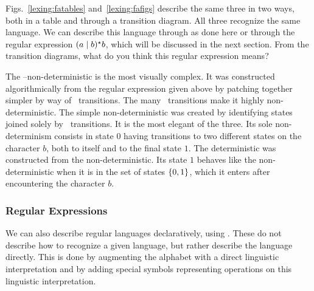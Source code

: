 Figs.~\ref{lexing:fatables} and~\ref{lexing:fafigs} describe the same three \FAs in two ways, both in a table and through a transition diagram. All three \FAs recognize the same language. We can describe this language through \FAs as done here or through the regular expression $(a \mid b)^{\star}{} b$, which will be discussed in the next section. From the transition diagrams, what do you think this regular expression means?

The \emptyword--non-deterministic \FA is the most visually complex. It was constructed algorithmically from the regular expression given above by patching together simpler \FAs by way of \emptyword\ transitions. The many \emptyword\ transitions make it highly non-deterministic. The simple non-deterministic \FA was created by identifying states joined solely by \emptyword\ transitions. It is the most elegant of the three. Its sole non-determinism consists in state $0$ having transitions to two different states on the character $b$, both to itself and to the final state $1$. The deterministic \FA was constructed from the non-deterministic. Its state $1$ behaves like the non-deterministic \FA when it is in the set of states $\left\{ 0,1 \right\}$, which it enters after encountering the character $b$.

\subsubsection{Regular Expressions}
We can also describe regular languages declaratively, using . These do not describe how to recognize a given language, but rather describe the language directly. This is done by augmenting the alphabet with a direct linguistic interpretation and by adding special symbols representing operations on this linguistic interpretation. 

